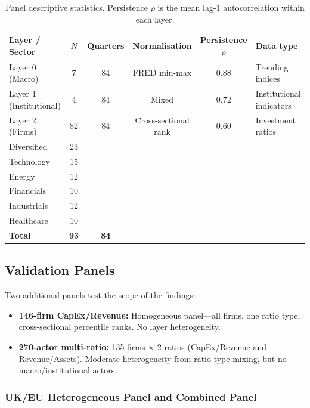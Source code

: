 \documentclass[11pt,a4paper]{article}
\begin{document}
\begin{table}[ht]
\centering
\caption{Panel descriptive statistics. Persistence $\rho$ is the mean lag-1 autocorrelation within each layer.}
\label{tab:panel_stats}
\small
\begin{tabular}{lccccl}
\toprule
Layer / Sector & $N$ & Quarters & Normalisation & Persistence $\rho$ & Data type \\
\midrule
Layer 0 (Macro) & 7 & 84 & FRED min-max & 0.88 & Trending indices \\
Layer 1 (Institutional) & 4 & 84 & Mixed & 0.72 & Institutional indicators \\
Layer 2 (Firms) & 82 & 84 & Cross-sectional rank & 0.60 & Investment ratios \\
\midrule
\quad Diversified & 23 & & & & \\
\quad Technology & 15 & & & & \\
\quad Energy & 12 & & & & \\
\quad Financials & 10 & & & & \\
\quad Industrials & 12 & & & & \\
\quad Healthcare & 10 & & & & \\
\midrule
\textbf{Total} & \textbf{93} & \textbf{84} & & & \\
\bottomrule
\end{tabular}
\end{table}

\subsection{Validation Panels}

Two additional panels test the scope of the findings:

\begin{itemize}[nosep]
  \item \textbf{146-firm CapEx/Revenue:} Homogeneous panel---all firms, one ratio type, cross-sectional percentile ranks. No layer heterogeneity.
  \item \textbf{270-actor multi-ratio:} 135 firms $\times$ 2 ratios (CapEx/Revenue and Revenue/Assets). Moderate heterogeneity from ratio-type mixing, but no macro/institutional actors.
\end{itemize}

\subsubsection*{UK/EU Heterogeneous Panel and Combined Panel}
\label{sec:uk_eu_panel_intro}
\end{document}

